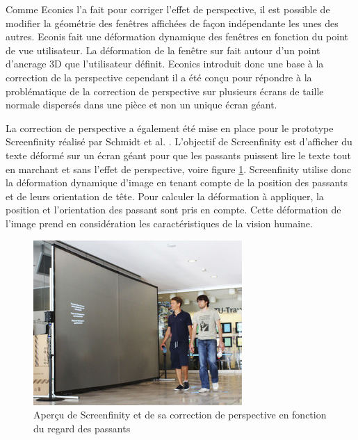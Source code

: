 Comme Econics l'a fait pour corriger l'effet de perspective, il est possible de modifier la géométrie des fenêtres affichées de façon indépendante les unes des autres. Econis fait une déformation dynamique des fenêtres en fonction du point de vue utilisateur. La déformation de la fenêtre sur fait autour d'un point d'ancrage 3D que l'utilisateur définit. Econics introduit donc une base à la correction de la perspective cependant il a été conçu pour répondre à la problématique de la correction de perspective sur plusieurs écrans de taille normale dispersés dans une pièce et non un unique écran géant. 

La correction de perspective a également été mise en place pour le prototype Screenfinity \cite{Schmidt:2013:SEP:2470654.2466227} réalisé par Schmidt et al. . L'objectif de Screenfinity est d'afficher du texte déformé sur un écran géant pour que les passants puissent lire le texte tout en marchant et sans l'effet de perspective, voire figure \ref{fig:screenfinity}. Screenfinity utilise donc la déformation dynamique d'image en tenant compte de la position des passants et de leurs orientation de tête. Pour calculer la déformation à appliquer, la position et l'orientation des passant sont pris en compte. Cette déformation de l'image prend en considération les caractéristiques de la vision humaine.

\begin{figure}[!ht]
	\center	
	\includegraphics[scale=1]{image/screenfinity.jpg}
	\caption{Aperçu de Screenfinity et de sa correction de perspective en fonction du regard des passants}
	\label{fig:screenfinity}
\end{figure}


